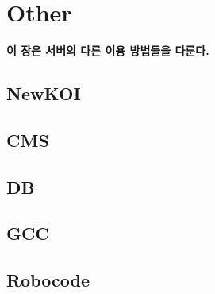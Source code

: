 
\graphicspath{{./chap5/images/}}  
\chapter{Other}

\textbf{이 장은 서버의 다른 이용 방법들을 다룬다.}

\section{NewKOI}
\section{CMS}
\section{DB}
\section{GCC}
\section{Robocode}

